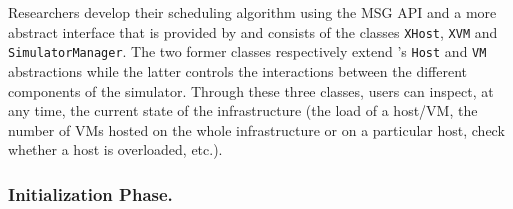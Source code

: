 Researchers develop their scheduling algorithm using the \sg
MSG API and a more abstract interface that is provided by \vmps
and consists of the classes \texttt{XHost}, \texttt{XVM} and
\texttt{SimulatorManager}. The two former classes respectively
extend \sg's \texttt{Host} and \texttt{VM} abstractions while the
latter controls the interactions between the different components of
the simulator.  Through these three classes, users can
inspect, at any time, the current state of the infrastructure (\ie the
load of a host/VM, the number of VMs hosted on the whole
infrastructure or on a particular host, check whether a host is
overloaded, etc.).




\subsubsection{Initialization Phase.}

